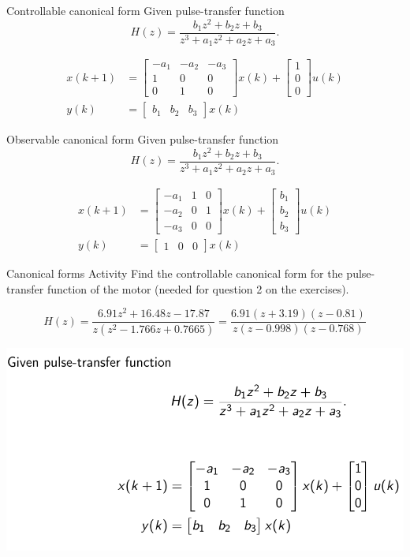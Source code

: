 \documentclass[presentation,aspectratio=1610]{beamer}
\begin{document}
\begin{frame}[label={sec:org11e0a2a}]{Controllable canonical form}
Given pulse-transfer function 
\[ H(z) = \frac{b_1 z^2 + b_2 z + b_3}{z^3 + a_1z^2 + a_2z + a_3}.\] 

\begin{align*}
 x(k+1) &= \begin{bmatrix} -a_1 & -a_2 & -a_3\\1 & 0 & 0\\0 & 1 & 0\end{bmatrix} x(k) + \begin{bmatrix}1\\0\\0\end{bmatrix} u(k) \\
 y(k) &= \begin{bmatrix} b_1 & b_2 & b_3 \end{bmatrix} x(k)
 \end{align*}
\end{frame}


\begin{frame}[label={sec:orgc102ae9}]{Observable canonical form}
Given pulse-transfer function 
\[ H(z) = \frac{b_1 z^2 + b_2 z + b_3}{z^3 + a_1z^2 + a_2z + a_3}.\] 

\begin{align*}
 x(k+1) &= \begin{bmatrix} -a_1 & 1 & 0\\-a_2 & 0 & 1\\-a_3 & 0 & 0\end{bmatrix} x(k) + \begin{bmatrix}b_1\\b_2\\b_3\end{bmatrix} u(k) \\
 y(k) &= \begin{bmatrix} 1 & 0 & 0 \end{bmatrix} x(k)
 \end{align*}
\end{frame}


\begin{frame}[label={sec:org29c6710}]{Canonical forms}
\alert{Activity} Find the controllable canonical form for the pulse-transfer function of the motor (needed for question 2 on the exercises).

\[ H(z) = \frac{6.91z^2 + 16.48z -17.87}{z(z^2 - 1.766z + 0.7665)} = \frac{6.91(z+3.19)(z-0.81)}{z(z-0.998)(z-0.768)}\]

\pause

\begin{center}
  \includegraphics[width=.6\linewidth]{../../figures/discrete-controllable.png}
\end{center}
\end{frame}
\end{document}
